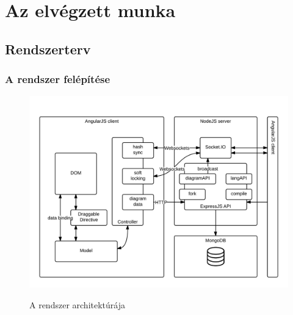 \chapter{Az elvégzett munka}




\section{Rendszerterv}






\subsection{A rendszer felépítése}

\begin{figure}[!ht]
\centering
\includegraphics[width=\textwidth,height=\textheight,keepaspectratio]{figures/Rendszerterv.png}\\
\caption{A rendszer architektúrája}
\label{fig:arch}
\end{figure}

